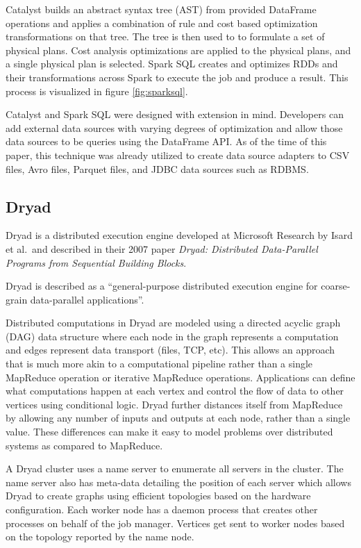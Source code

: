 \documentclass[]{article}
\begin{document}
Catalyst builds an abstract syntax tree (AST) from provided DataFrame operations and applies a combination of rule and cost based optimization transformations on that tree. The tree is then used to to formulate a set of physical plans. Cost analysis optimizations are applied to the physical plans, and a single physical plan is selected. Spark SQL creates and optimizes RDDs and their transformations across Spark to execute the job and produce a result. This process is visualized in figure \ref{fig:sparksql}.

Catalyst and Spark SQL were designed with extension in mind. Developers can add external data sources with varying degrees of optimization and allow those data sources to be queries using the DataFrame API. As of the time of this paper, this technique was already utilized to create data source adapters to CSV files, Avro files, Parquet files, and JDBC data sources such as RDBMS.

\subsection{Dryad}\label{ssec:dryad}
Dryad is a distributed execution engine developed at Microsoft Research by Isard et al.\ and described in their 2007 paper \textit{Dryad: Distributed Data-Parallel Programs from Sequential Building Blocks}\cite{isard2007dryad}. 

Dryad is described as a ``general-purpose distributed execution engine for coarse-grain data-parallel applications''.

Distributed computations in Dryad are modeled using a directed acyclic graph (DAG) data structure where each node in the graph represents a computation and edges represent data transport (files, TCP, etc). This allows an approach that is much more akin to a computational pipeline rather than a single MapReduce operation or iterative MapReduce operations. Applications can define what computations happen at each vertex and control the flow of data to other vertices using conditional logic. Dryad further distances itself from MapReduce by allowing any number of inputs and outputs at each node, rather than a single value. These differences can make it easy to model problems over distributed systems as compared to MapReduce.

A Dryad cluster uses a name server to enumerate all servers in the cluster. The name server also has meta-data detailing the position of each server which allows Dryad to create graphs using efficient topologies based on the hardware configuration. Each worker node has a daemon process that creates other processes on behalf of the job manager. Vertices get sent to worker nodes based on the topology reported by the name node.
\end{document}

